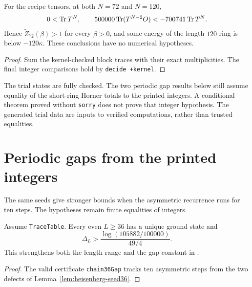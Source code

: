 \begin{lemma}
  \label{lem:kernel-spin1-trials}
  \leanok
  For the recipe tensors, at both \(N=72\) and \(N=120\),
  \[
    0<\operatorname{Tr} T^N,\qquad
    500000\operatorname{Tr}(T^{N-2}O)<-700741\operatorname{Tr} T^N.
  \]
  Hence \(\widetilde Z_{72}(\beta)>1\) for every \(\beta>0\), and some energy of the
  length-\(120\) ring is below \(-120\kappa\).
  These conclusions have no numerical hypotheses.
\end{lemma}
\begin{proof}
  \leanok
  Sum the kernel-checked block traces with their exact multiplicities.
  The final integer comparisons hold by \texttt{decide +kernel}.
\end{proof}

\begin{remark}
  \label{rem:spin1-trial}
  The trial states are fully checked. The two periodic gap results below still assume equality
  of the short-ring Horner totals to the printed integers.
  A conditional theorem proved without \texttt{sorry} does not prove that integer hypothesis.
  The generated trial data are inputs to verified computations, rather than trusted equalities.
\end{remark}

\section{Periodic gaps from the printed integers}

The same seeds give stronger bounds when the asymmetric recurrence runs for ten steps.
The hypotheses remain finite equalities of integers.

\begin{theorem}
  \label{thm:kernel-gap36-table}
  \leanok
  Assume \texttt{TraceTable}. Every even \(L\ge36\) has a unique ground state and
  \[
    \Delta_L>\frac{\log(105882/100000)}{49/4}.
  \]
  This strengthens both the length range and the gap constant in
  \cite[equation (1.4)]{OpenAIHaldane}.
\end{theorem}
\begin{proof}
  \leanok
  The valid certificate \texttt{chain36Gap} tracks ten asymmetric steps from the two
  defects of Lemma~\ref{lem:heisenberg-seed36}.
\end{proof}


